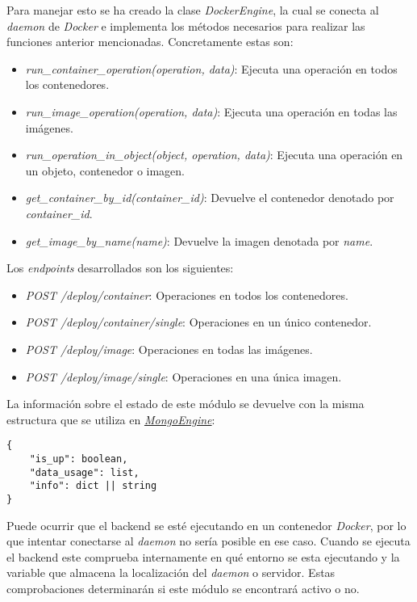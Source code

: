 \bigskip
Para manejar esto se ha creado la clase \textit{DockerEngine}, la cual se conecta al \textit{daemon} de \textit{Docker} e implementa los métodos necesarios para realizar las funciones anterior mencionadas. Concretamente estas son:
\begin{itemize}
	\item \textit{run\_container\_operation(operation, data)}: Ejecuta una operación en todos los contenedores.
	\item \textit{run\_image\_operation(operation, data)}: Ejecuta una operación en todas las imágenes.
	\item \textit{run\_operation\_in\_object(object, operation, data)}: Ejecuta una operación en un objeto, contenedor o imagen.
	\item \textit{get\_container\_by\_id(container\_id)}: Devuelve el contenedor denotado por \textit{container\_id}.
	\item \textit{get\_image\_by\_name(name)}: Devuelve la imagen denotada por \textit{name}.
\end{itemize}


\bigskip
Los \textit{endpoints} desarrollados son los siguientes:
\begin{itemize}
	\item \textit{POST /deploy/container}: Operaciones en todos los contenedores.
	\item \textit{POST /deploy/container/single}: Operaciones en un único contenedor.
	\item \textit{POST /deploy/image}: Operaciones en todas las imágenes.
	\item \textit{POST /deploy/image/single}: Operaciones en una única imagen.
\end{itemize}


\bigskip
La información sobre el estado de este módulo se devuelve con la misma estructura que se utiliza en \hyperref[sec:mongoengine]{\textit{MongoEngine}}:
\begin{lstlisting}
{
	"is_up": boolean,
	"data_usage": list,
	"info": dict || string
}
\end{lstlisting}



\bigskip
Puede ocurrir que el backend se esté ejecutando en un contenedor \textit{Docker}, por lo que intentar conectarse al \textit{daemon} no sería posible en ese caso. Cuando se ejecuta el backend este comprueba internamente en qué entorno se esta ejecutando y la variable que almacena la localización del \textit{daemon} o servidor. Estas comprobaciones determinarán si este módulo se encontrará activo o no.



